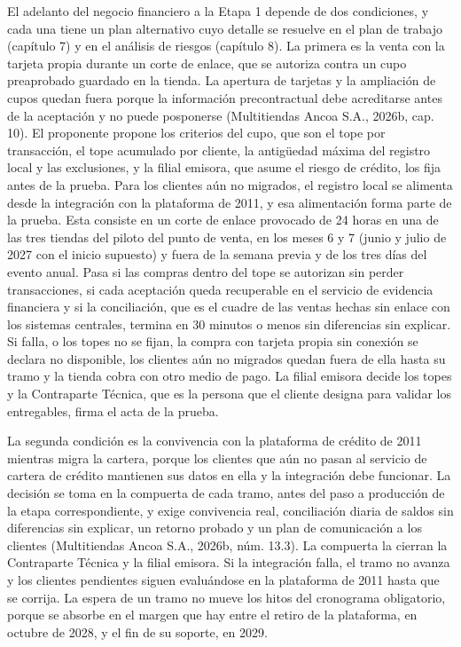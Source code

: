 \documentclass[11pt]{article}
\begin{document}
El adelanto del negocio financiero a la Etapa 1 depende de dos condiciones, y cada una tiene un plan alternativo cuyo detalle se resuelve en el plan de trabajo (capítulo 7) y en el análisis de riesgos (capítulo 8). La primera es la venta con la tarjeta propia durante un corte de enlace, que se autoriza contra un cupo preaprobado guardado en la tienda. La apertura de tarjetas y la ampliación de cupos quedan fuera porque la información precontractual debe acreditarse antes de la aceptación y no puede posponerse (Multitiendas Ancoa S.A., 2026b, cap. 10). El proponente propone los criterios del cupo, que son el tope por transacción, el tope acumulado por cliente, la antigüedad máxima del registro local y las exclusiones, y la filial emisora, que asume el riesgo de crédito, los fija antes de la prueba. Para los clientes aún no migrados, el registro local se alimenta desde la integración con la plataforma de 2011, y esa alimentación forma parte de la prueba. Esta consiste en un corte de enlace provocado de 24 horas en una de las tres tiendas del piloto del punto de venta, en los meses 6 y 7 (junio y julio de 2027 con el inicio supuesto) y fuera de la semana previa y de los tres días del evento anual. Pasa si las compras dentro del tope se autorizan sin perder transacciones, si cada aceptación queda recuperable en el servicio de evidencia financiera y si la conciliación, que es el cuadre de las ventas hechas sin enlace con los sistemas centrales, termina en 30 minutos o menos sin diferencias sin explicar. Si falla, o los topes no se fijan, la compra con tarjeta propia sin conexión se declara no disponible, los clientes aún no migrados quedan fuera de ella hasta su tramo y la tienda cobra con otro medio de pago. La filial emisora decide los topes y la Contraparte Técnica, que es la persona que el cliente designa para validar los entregables, firma el acta de la prueba.

La segunda condición es la convivencia con la plataforma de crédito de 2011 mientras migra la cartera, porque los clientes que aún no pasan al servicio de cartera de crédito mantienen sus datos en ella y la integración debe funcionar. La decisión se toma en la compuerta de cada tramo, antes del paso a producción de la etapa correspondiente, y exige convivencia real, conciliación diaria de saldos sin diferencias sin explicar, un retorno probado y un plan de comunicación a los clientes (Multitiendas Ancoa S.A., 2026b, núm. 13.3). La compuerta la cierran la Contraparte Técnica y la filial emisora. Si la integración falla, el tramo no avanza y los clientes pendientes siguen evaluándose en la plataforma de 2011 hasta que se corrija. La espera de un tramo no mueve los hitos del cronograma obligatorio, porque se absorbe en el margen que hay entre el retiro de la plataforma, en octubre de 2028, y el fin de su soporte, en 2029.
\end{document}
